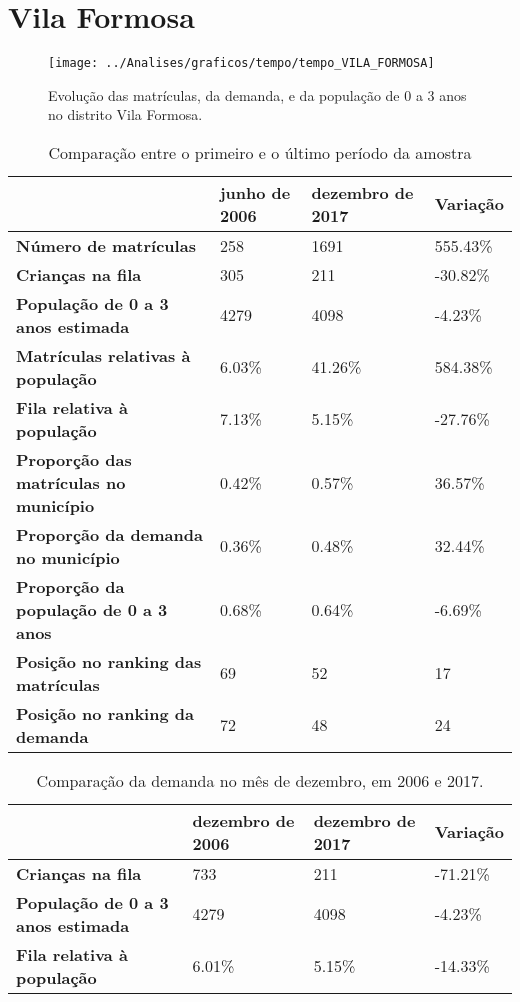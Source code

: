 \section{Vila Formosa}
\begin{figure}[H]
\centering
\texttt{[image: ../Analises/graficos/tempo/tempo\_VILA\_FORMOSA]}
\caption{Evolução das matrículas, da demanda, e da população de 0 a 3 anos no distrito Vila Formosa.}
\end{figure}
\begin{table}[H]
\begin{tabular}{|l|l|l|l|}
\hline
\textbf{}                                      & \textbf{junho de 2006}       & \textbf{dezembro de 2017}    & \textbf{Variação} \\ \hline
\textbf{Número de matrículas}                  & 258 & 1691 & 555.43\% \\ \hline
\textbf{Crianças na fila}                      & 305 & 211 & -30.82\% \\ \hline
\textbf{População de 0 a 3 anos estimada}      & 4279 & 4098 & -4.23\% \\ \hline
\textbf{Matrículas relativas à população}      & 6.03\% & 41.26\% & 584.38\% \\ \hline
\textbf{Fila relativa à população}             & 7.13\% & 5.15\% & -27.76\% \\ \hline
\textbf{Proporção das matrículas no município} & 0.42\% & 0.57\% & 36.57\% \\ \hline
\textbf{Proporção da demanda no município}     & 0.36\% & 0.48\% & 32.44\% \\ \hline
\textbf{Proporção da população de 0 a 3 anos}  & 0.68\% & 0.64\% & -6.69\% \\ \hline
\textbf{Posição no ranking das matrículas}     & 69 & 52 & 17 \\ \hline
\textbf{Posição no ranking da demanda}         & 72 & 48 & 24 \\ \hline
\end{tabular}
\caption{Comparação entre o primeiro e o último período da amostra}
\end{table}
\begin{table}[H]
\begin{tabular}{|l|l|l|l|}
\hline
\textbf{}                                 & \textbf{dezembro de 2006} & \textbf{dezembro de 2017} & \textbf{Variação} \\ \hline
\textbf{Crianças na fila}                      & 733 & 211 & -71.21\% \\ \hline
\textbf{População de 0 a 3 anos estimada}      & 4279 & 4098 & -4.23\% \\ \hline
\textbf{Fila relativa à população}             & 6.01\% & 5.15\% & -14.33\% \\ \hline
\end{tabular}
\caption{Comparação da demanda no mês de dezembro, em 2006 e 2017.}
\end{table}
